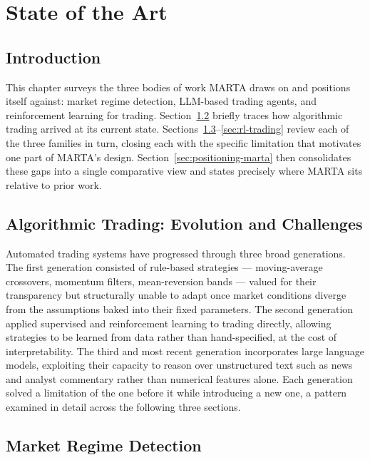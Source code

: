 \chapter{State of the Art}
\label{chap:background}

\section{Introduction}
\label{sec:background-intro}

This chapter surveys the three bodies of work MARTA draws on and positions itself against: market regime detection, LLM-based trading agents, and reinforcement learning for trading. Section~\ref{sec:algo-trading-evolution} briefly traces how algorithmic trading arrived at its current state. Sections~\ref{sec:regime-detection}--\ref{sec:rl-trading} review each of the three families in turn, closing each with the specific limitation that motivates one part of MARTA's design. Section~\ref{sec:positioning-marta} then consolidates these gaps into a single comparative view and states precisely where MARTA sits relative to prior work.

\section{Algorithmic Trading: Evolution and Challenges}
\label{sec:algo-trading-evolution}

Automated trading systems have progressed through three broad generations. The first generation consisted of rule-based strategies --- moving-average crossovers, momentum filters, mean-reversion bands --- valued for their transparency but structurally unable to adapt once market conditions diverge from the assumptions baked into their fixed parameters. The second generation applied supervised and reinforcement learning to trading directly, allowing strategies to be learned from data rather than hand-specified, at the cost of interpretability. The third and most recent generation incorporates large language models, exploiting their capacity to reason over unstructured text such as news and analyst commentary rather than numerical features alone. Each generation solved a limitation of the one before it while introducing a new one, a pattern examined in detail across the following three sections.

\section{Market Regime Detection}
\label{sec:regime-detection}

